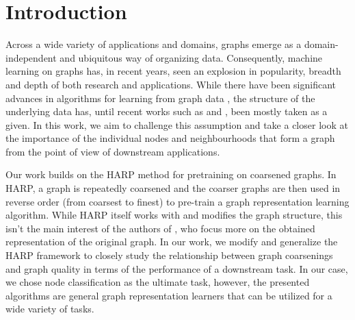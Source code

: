 \section{Introduction}
Across a wide variety of applications and domains, graphs emerge as a domain-independent and ubiquitous way of organizing data. Consequently, machine learning on graphs has, in recent years, seen an explosion in popularity, breadth and depth of both research and applications. While there have been significant advances in algorithms for learning from graph data \cite{kipf_semi-supervised_2016, defferrard_convolutional_2016, chamberlain_grand_2021, li_deepergcn_2021}, the structure of the underlying data has, until recent works such as \cite{topping_understanding_2021} and \cite{velickovic_geometric_2021}, been mostly taken as a given. In this work, we aim to challenge this assumption and take a closer look at the importance of the individual nodes and neighbourhoods that form a graph from the point of view of downstream applications.

Our work builds on the HARP \cite{chen_harp_2018} method for pretraining on coarsened graphs. In HARP, a graph is repeatedly coarsened and the coarser graphs are then used in reverse order (from coarsest to finest) to pre-train a graph representation learning algorithm. While HARP itself works with and modifies the graph structure, this isn't the main interest of the authors of \cite{chen_harp_2018}, who focus more on the obtained representation of the original graph. In our work, we modify and generalize the HARP framework to closely study the relationship between graph coarsenings and graph quality in terms of the performance of a downstream task. In our case, we chose node classification as the ultimate task, however, the presented algorithms are general graph representation learners that can be utilized for a wide variety of tasks.


